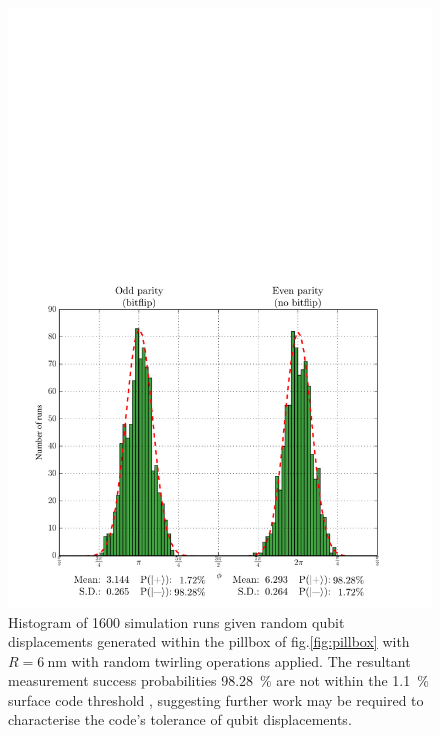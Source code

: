 



\begin{figure}
	\centering
	\includegraphics[width=\columnwidth]{../Figures/Displacement_Histogram.pdf}	
	\caption{Histogram of 1600 simulation runs given random qubit displacements generated within the pillbox of fig.\@ \ref{fig:pillbox} with $R = \SI{6}{\nano\metre}$ with random twirling operations applied. The resultant measurement success probabilities \SI{98.28}{\percent} are not within the \SI{1.1}{\percent} surface code threshold \cite{Wang2011,Fowler2012}, suggesting further work may be required to characterise the code's tolerance of qubit displacements. }
	\label{fig:DisplacementHistogram}
\end{figure}